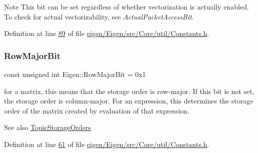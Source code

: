 \begin{DoxyNote}{Note}
This bit can be set regardless of whether vectorization is actually enabled. To check for actual vectorizability, see {\itshape Actual\+Packet\+Access\+Bit}. 
\end{DoxyNote}


Definition at line \hyperlink{eigen_2_eigen_2src_2_core_2util_2_constants_8h_source_l00089}{89} of file \hyperlink{eigen_2_eigen_2src_2_core_2util_2_constants_8h_source}{eigen/\+Eigen/src/\+Core/util/\+Constants.\+h}.

\mbox{\label{group__flags_gae4f56c2a60bbe4bd2e44c5b19cbe8762}} 
\subsubsection{\texorpdfstring{Row\+Major\+Bit}{RowMajorBit}}
{\footnotesize\ttfamily const unsigned int Eigen\+::\+Row\+Major\+Bit = 0x1}

for a matrix, this means that the storage order is row-\/major. If this bit is not set, the storage order is column-\/major. For an expression, this determines the storage order of the matrix created by evaluation of that expression. \begin{DoxySeeAlso}{See also}
\hyperlink{group___topic_storage_orders}{Topic\+Storage\+Orders} 
\end{DoxySeeAlso}


Definition at line \hyperlink{eigen_2_eigen_2src_2_core_2util_2_constants_8h_source_l00061}{61} of file \hyperlink{eigen_2_eigen_2src_2_core_2util_2_constants_8h_source}{eigen/\+Eigen/src/\+Core/util/\+Constants.\+h}.

